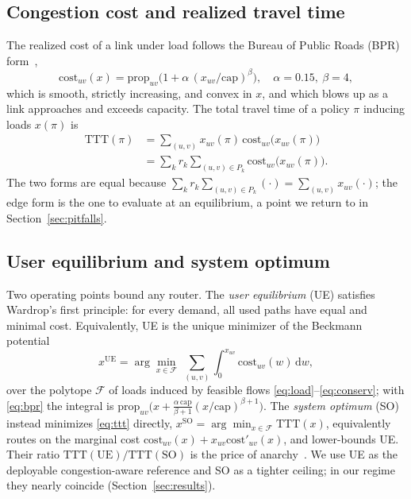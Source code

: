 \documentclass[journal]{IEEEtran}
\newcommand{\cost}{\mathrm{cost}}
\newcommand{\prop}{\mathrm{prop}}
\newcommand{\cpc}{\mathrm{cap}}
\newcommand{\TTT}{\mathrm{TTT}}
\begin{document}
\subsection{Congestion cost and realized travel time}
The realized cost of a link under load follows the Bureau of Public Roads (BPR)
form~\cite{bpr},
\begin{equation}
\cost_{uv}(x)=\prop_{uv}\Big(1+\alpha\,(x_{uv}/\cpc)^{\beta}\Big),
\quad \alpha=0.15,\ \beta=4 ,
\label{eq:bpr}
\end{equation}
which is smooth, strictly increasing, and convex in $x$, and which blows up as a link
approaches and exceeds capacity. The total travel time of a policy $\pi$ inducing loads
$x(\pi)$ is
\begin{equation}
\begin{aligned}
\TTT(\pi)&=\sum_{(u,v)}x_{uv}(\pi)\,\cost_{uv}\big(x_{uv}(\pi)\big)\\
         &=\sum_{k} r_k \!\!\sum_{(u,v)\in P_k}\!\!\cost_{uv}\big(x_{uv}(\pi)\big).
\end{aligned}
\label{eq:ttt}
\end{equation}
The two forms are equal because $\sum_k r_k\sum_{(u,v)\in P_k}(\cdot)=\sum_{(u,v)}x_{uv}(\cdot)$;
the edge form is the one to evaluate at an equilibrium, a point we return to in
Section~\ref{sec:pitfalls}.

\subsection{User equilibrium and system optimum}
Two operating points bound any router. The \emph{user equilibrium} (UE) satisfies
Wardrop's first principle: for every demand, all used paths have equal and minimal
cost. Equivalently, UE is the unique minimizer of the Beckmann
potential~\cite{beckmann}
\begin{equation}
x^{\mathrm{UE}}=\arg\min_{x\in\mathcal{F}}\ \sum_{(u,v)}\int_{0}^{x_{uv}}
\cost_{uv}(w)\,\mathrm{d}w ,
\label{eq:beckmann}
\end{equation}
over the polytope $\mathcal{F}$ of loads induced by feasible flows
\eqref{eq:load}--\eqref{eq:conserv}; with \eqref{eq:bpr} the integral is
$\prop_{uv}\!\big(x+\tfrac{\alpha\,\cpc}{\beta+1}(x/\cpc)^{\beta+1}\big)$. The
\emph{system optimum} (SO) instead minimizes \eqref{eq:ttt} directly,
$x^{\mathrm{SO}}=\arg\min_{x\in\mathcal{F}}\TTT(x)$, equivalently routes on the marginal
cost $\cost_{uv}(x)+x_{uv}\cost'_{uv}(x)$, and lower-bounds UE. Their ratio
$\TTT(\mathrm{UE})/\TTT(\mathrm{SO})$ is the price of anarchy~\cite{poa}. We use UE as
the deployable congestion-aware reference and SO as a tighter ceiling; in our regime
they nearly coincide (Section~\ref{sec:results}).
\end{document}
